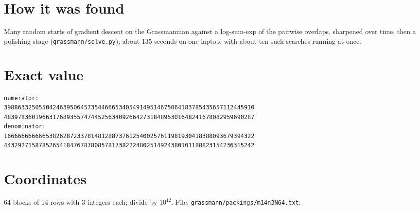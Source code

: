 \documentclass[11pt,a4paper]{article}
\begin{document}
\section{How it was found}
Many random starts of gradient descent on the Grassmannian against a log-sum-exp of the pairwise overlaps, sharpened over time, then a polishing stage (\texttt{grassmann/solve.py}); about 135 seconds on one laptop, with about ten such searches running at once.


\appendix
\section{Exact value}
{\small
\begin{verbatim}
numerator:
398863325055042463950645735446665340549149514675064183785435657112445910
483978360196631768935574744525634092664273184895301648241678082959690287
denominator:
166666666666538262872337814812887376125400257611981930418388093679394322
443292715878526541847678780857817382224802514924380101188823154236315242
\end{verbatim}}

\section{Coordinates}
64 blocks of 14 rows with 3 integers each; divide by $10^{12}$. File: \texttt{grassmann/packings/m14n3N64.txt}.
{\tiny
\begin{multicols}{3}
\end{multicols}}
\end{document}
